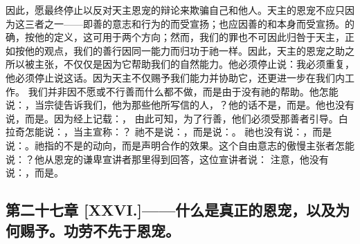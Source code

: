 因此，愿最终停止以反对天主恩宠的辩论来欺骗自己和他人。天主的恩宠不应只因为这三者之一——即善的意志和行为的而受宣扬；也应因善的和本身而受宣扬。的确，按他的定义，这可用于两个方向；然而，我们的罪也不可因此归咎于天主，正如按他的观点，我们的善行因同一能力而归功于祂一样。因此，天主的恩宠之助之所以被主张，不仅仅是因为它帮助我们的自然能力。他必须停止说：我必须重复，他必须停止说这话。因为天主不仅赐予我们能力并协助它，还更进一步在我们内工作。 我们并非因不愿或不行善而什么都不做，而是由于没有祂的帮助。他怎能说：，当宗徒告诉我们，他为那些他所写信的人，？他的话不是，而是。他也没有说，而是。因为经上记载：， 由此可知，为了行善，他们必须受那善者引导。白拉奇怎能说：，当主宣称：？ 祂不是说：，而是说：。 祂也没有说：，而是说：。祂指的不是的动向，而是声明合作的效果。这个自由意志的傲慢主张者怎能说：？他从恩宠的谦卑宣讲者那里得到回答，这位宣讲者说： 注意，他没有说：，而是。\par


\subsection{第二十七章 [XXVI.]——什么是真正的恩宠，以及为何赐予。功劳不先于恩宠。}


